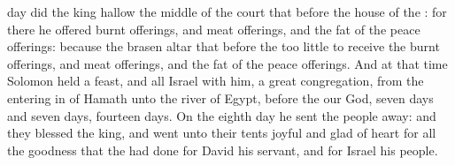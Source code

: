 {day did the
king
hallow the
middle of the
court that
{}
before the
house of the
{}: for there he
offered burnt
offerings, and meat
offerings, and the
fat of the peace
offerings: because the
brasen
altar that
{}
before the
{}
{} too
little to
receive the burnt
offerings, and meat
offerings, and the
fat of the peace
offerings.
And at that
time
Solomon
held a
feast, and all
Israel with him, a
great
congregation, from the
entering in of
Hamath unto the
river of
Egypt,
before the
{} our
God,
seven
days and
seven
days,
{}
fourteen
days.
On the
eighth
day he
sent the
people
away: and they
blessed the
king, and
went unto their
tents
joyful and
glad of
heart for all the
goodness that the
{} had
done for
David his
servant, and for
Israel his
people.

}
